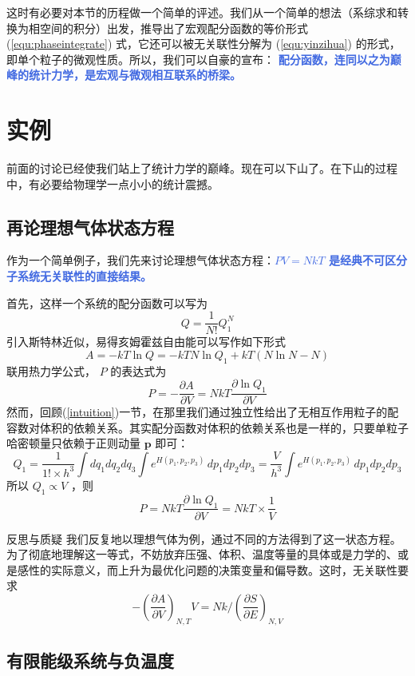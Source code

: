 这时有必要对本节的历程做一个简单的评述。我们从一个简单的想法（系综求和转换为相空间的积分）出发，推导出了宏观配分函数的等价形式 (\ref*{equ:phaseintegrate}) 式，它还可以被无关联性分解为 (\ref*{equ:yinzihua}) 的形式，即单个粒子的微观性质。所以，我们可以自豪的宣布： \textcolor{RoyalBlue}{\textbf{\kaishu 配分函数，连同以之为巅峰的统计力学，是宏观与微观相互联系的桥梁。}}

\section{实例}

前面的讨论已经使我们站上了统计力学的巅峰。现在可以下山了。在下山的过程中，有必要给物理学一点小小的统计震撼。

\subsection{再论理想气体状态方程}

作为一个简单例子，我们先来讨论理想气体状态方程：\textcolor{RoyalBlue}{\textbf{\kaishu $PV = NkT$ 是经典不可区分子系统无关联性的直接结果。}}

首先，这样一个系统的配分函数可以写为
\[
    Q = \frac{1}{N!} Q_1^N
\]
引入斯特林近似，易得亥姆霍兹自由能可以写作如下形式
\[
    A = -kT\ln Q = -kT N \ln Q_1 + kT(N\ln N - N)
\]
联用热力学公式， $P$ 的表达式为
\[
    P = - \frac{\partial A}{\partial V} = NkT \frac{\partial \ln Q_1}{\partial V}
\]
然而，回顾(\ref*{intuition})一节，在那里我们通过独立性给出了无相互作用粒子的配容数对体积的依赖关系。其实配分函数对体积的依赖关系也是一样的，只要单粒子哈密顿量只依赖于正则动量 $\bm{p}$ 即可：
\[
    Q_1 = \frac{1}{1!\times h^3}\int dq_1dq_2dq_3\int e^{H(p_1,p_2,p_3)}\,dp_1dp_2dp_3  = \frac{V}{h^3} \int e^{H(p_1,p_2,p_3)}\,dp_1dp_2dp_3
\]
所以 $Q_1 \propto V$ ，则
\[
    P = NkT \frac{\partial \ln Q_1}{\partial V} = NkT \times \frac{1}{V} 
\]
\begin{justification}{\kaishu 反思与质疑}
\kaishu \fontsize{11pt}{16pt}
    \quad\quad 我们反复地以理想气体为例，通过不同的方法得到了这一状态方程。为了彻底地理解这一等式，不妨放弃压强、体积、温度等量的具体或是力学的、或是感性的实际意义，而上升为最优化问题的决策变量和偏导数。这时，无关联性要求
    \[
        -\left(\frac{\partial A}{\partial V}\right)_{N,T} V = Nk \bigg/ \left(\frac{\partial S}{\partial E} \right)_{N,V}
    \]
\end{justification}

\subsection{有限能级系统与负温度}

